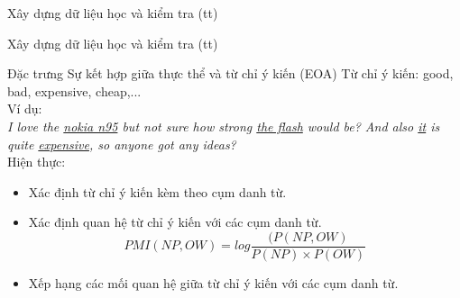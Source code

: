 \documentclass[9pt,xcolor=table,hyperref=unicode]{beamer}
\begin{document}
	\begin{frame}{Xây dựng dữ liệu học và kiểm tra (tt)}		
		\begin{table}[]		
		\parbox{\textwidth}{
			\centering
			\fontsize{6pt}{7}\selectfont			
				
			\caption{Các đặc trưng được sử dụng trong hệ thống (tt)}
		}
		\end{table}
	\end{frame}


	\begin{frame}{Xây dựng dữ liệu học và kiểm tra (tt)}
		\begin{block}{Đặc trưng Sự kết hợp giữa thực thể và từ chỉ ý kiến (EOA)}			
			Từ chỉ ý kiến: good, bad, expensive, cheap,... \\ 
			Ví dụ:\\
			\textit{I love the \underline{nokia n95} but not sure how strong \underline{the flash} would be? And also \underline{it} is quite \underline{expensive}, so anyone got any ideas?} \\
			Hiện thực:
				\begin{itemize}
					\item{Xác định từ chỉ ý kiến kèm theo cụm danh từ.}
					\item{Xác định quan hệ từ chỉ ý kiến với các cụm danh từ. 
						\begin{equation*}
						PMI(NP,OW) = log\frac{(P(NP,OW)}{P(NP)\times P(OW)}
						\end{equation*}
				}
					\item{Xếp hạng các mối quan hệ giữa từ chỉ ý kiến với các cụm danh từ.}
				\end{itemize}

		\end{block}	
	\end{frame}
\end{document}
